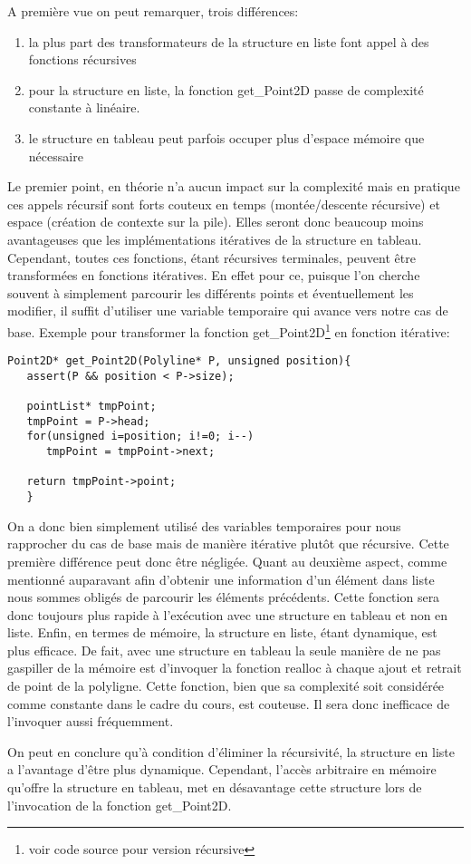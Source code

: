 \documentclass[a4paper, 11pt, oneside]{article}
\begin{document}
\noindent A première vue on peut remarquer, trois différences:
\begin{enumerate}
    \item la plus part des transformateurs de la structure en liste font appel à des fonctions récursives
    \item pour la structure en liste, la fonction get\_Point2D passe de complexité constante à linéaire.
    \item le structure en tableau peut parfois occuper plus d'espace mémoire que nécessaire
\end{enumerate}
Le premier point, en théorie n'a aucun impact sur la complexité mais en pratique ces appels récursif sont forts couteux en temps (montée/descente récursive) et espace (création de contexte sur la pile). Elles seront donc beaucoup moins avantageuses que les implémentations itératives de la structure en tableau. Cependant, toutes ces fonctions, étant récursives terminales, peuvent être transformées en fonctions itératives. En effet pour ce, puisque l'on cherche souvent à simplement parcourir les différents points et éventuellement les modifier, il suffit d'utiliser une variable temporaire qui avance vers notre cas de base. Exemple pour transformer la fonction get\_Point2D\footnote{voir code source pour version récursive} en fonction itérative:

\begin{lstlisting}
Point2D* get_Point2D(Polyline* P, unsigned position){
   assert(P && position < P->size);
   
   pointList* tmpPoint;
   tmpPoint = P->head;
   for(unsigned i=position; i!=0; i--)
      tmpPoint = tmpPoint->next;
   
   return tmpPoint->point;
   }
\end{lstlisting}

On a donc bien simplement utilisé des variables temporaires pour nous rapprocher du cas de base mais de manière itérative plutôt que récursive. Cette première différence peut donc être négligée.
Quant au deuxième aspect, comme mentionné auparavant afin d'obtenir une information d'un élément dans liste nous sommes obligés de parcourir les éléments précédents. Cette fonction sera donc toujours plus rapide à l'exécution avec une structure en tableau et non en liste.
Enfin, en termes de mémoire, la structure en liste, étant dynamique, est plus efficace. De fait, avec une structure en tableau la seule manière de ne pas gaspiller de la mémoire est d'invoquer la fonction realloc à chaque ajout et retrait de point de la polyligne. Cette fonction, bien que sa complexité soit considérée comme constante dans le cadre du cours, est couteuse. Il sera donc inefficace de l'invoquer aussi fréquemment.

On peut en conclure qu'à condition d'éliminer la récursivité, la structure en liste a l'avantage d'être plus dynamique. Cependant, l'accès arbitraire en mémoire qu'offre la structure en tableau, met en désavantage cette structure lors de l'invocation de la fonction get\_Point2D.
\end{document}
